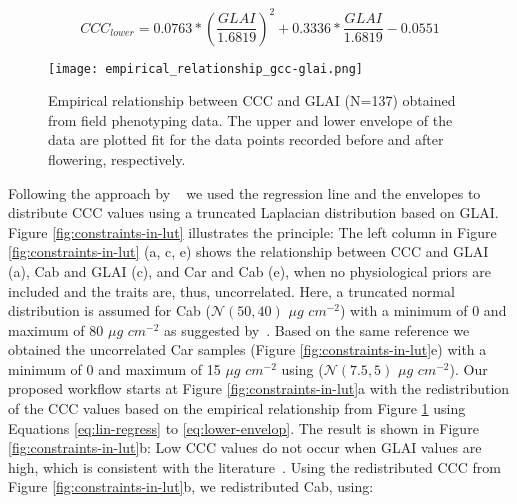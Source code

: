 \begin{equation}
\label{eq:lower-envelop}
    CCC_{lower} = 0.0763 * \left(\frac{GLAI}{1.6819}\right)^2 + 0.3336 * \frac{GLAI}{1.6819} - 0.0551
\end{equation}

\begin{figure}[H]
    \centering
    \texttt{[image: empirical\_relationship\_gcc-glai.png]}
    \caption[Empirical relationship between CCC and GLAI (N=137) obtained from field phenotyping data. The upper and lower envelope of the data are plotted fit for the data points recorded before and after flowering, respectively.]{Empirical relationship between CCC and GLAI (N=137) obtained from field phenotyping data. The upper and lower envelope of the data are plotted fit for the data points recorded before and after flowering, respectively.}
    \label{fig:lai-ccc-relationship}
\end{figure}

Following the approach by ~\cite{wocher_rtm-based_2020} we used the regression line and the envelopes to distribute CCC values using a truncated Laplacian distribution based on GLAI. Figure \ref{fig:constraints-in-lut} illustrates the principle: The left column in Figure \ref{fig:constraints-in-lut} (a, c, e) shows the relationship between CCC and GLAI (a), Cab and GLAI (c), and Car and Cab (e), when no physiological priors are included and the traits are, thus, uncorrelated. Here, a truncated normal distribution is assumed for Cab ($\mathscr{N} (50,40)$ $\mu g$ $cm^{-2}$) with a minimum of 0 and maximum of 80 $\mu g$ $cm^{-2}$ as suggested by~\cite{danner_efficient_2021}. Based on the same reference we obtained the uncorrelated Car samples (Figure \ref{fig:constraints-in-lut}e) with a minimum of 0 and maximum of 15 $\mu g$ $cm^{-2}$ using ($\mathscr{N} (7.5,5)$ $\mu g$ $cm^{-2}$). Our proposed workflow starts at Figure \ref{fig:constraints-in-lut}a with the redistribution of the CCC values based on the empirical relationship from Figure \ref{fig:lai-ccc-relationship} using Equations \ref{eq:lin-regress} to \ref{eq:lower-envelop}. The result is shown in Figure \ref{fig:constraints-in-lut}b: Low CCC values do not occur when GLAI values are high, which is consistent with the literature~\citep{gitelson_relationships_2014}. Using the redistributed CCC from Figure \ref{fig:constraints-in-lut}b, we redistributed Cab, using:

